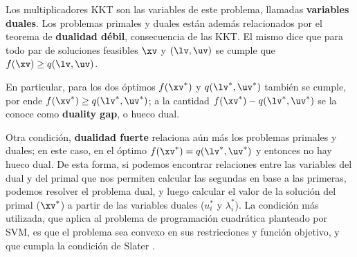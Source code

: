 
Los multiplicadores KKT son las variables de este problema, llamadas \textbf{variables duales}. Los problemas primales y duales están además relacionados por el teorema de \textbf{dualidad débil}, consecuencia de las KKT. El mismo dice que para todo par de soluciones feasibles  $\xv$ y $(\lv,\uv)$ se cumple que $f(\xv) \geq q(\lv,\uv)$.

En particular, para los dos óptimos $f(\xv^*)$ y $q(\lv^*,\uv^*)$ también se cumple, por ende $f(\xv^*) \geq q(\lv^*,\uv^*)$; a la cantidad $f(\xv^*) - q(\lv^*,\uv^*)$ se la conoce como \textbf{duality gap}, o hueco dual.

Otra condición, \textbf{dualidad fuerte} relaciona aún más los problemas primales y duales; en este caso, en el óptimo $f(\xv^*) = q(\lv^*,\uv^*)$ y entonces no hay hueco dual. De esta forma, si podemos encontrar relaciones entre las variables del dual y del primal que nos permiten calcular las segundas en base a las primeras, podemos resolver el problema dual, y luego calcular el valor de la solución del primal ($\xv^*$) a partir de las variables duales ($u_i^*$ y $\lambda_i^*$). La condición más utilizada, que aplica al problema de programación cuadrática planteado por SVM, es que el problema sea convexo en sus restricciones y función objetivo, y que cumpla la condición de Slater \cite{boyd2004}.
